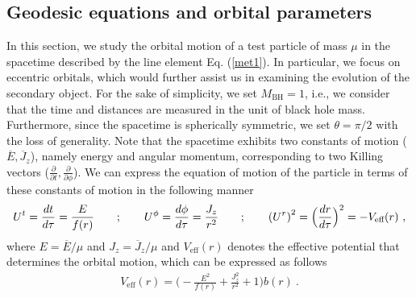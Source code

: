 \documentclass[11pt]{article}
\begin{document}
\subsection{Geodesic equations and orbital parameters}

In this section, we study the orbital motion of a test particle of mass $\mu$ in the spacetime described by the line element Eq. (\ref{met1}). In particular, we focus on eccentric orbitals, which would further assist us in examining the evolution of the secondary object. For the sake of simplicity, we set  $M_{\textrm{BH}}=1$, i.e., we consider that the time and distances are measured in the unit of black hole mass. Furthermore, since the spacetime is spherically symmetric, we set $\theta=\pi/2$ with the loss of generality.  
Note that the spacetime exhibits two constants of motion ($\overline{E}, \overline{J}_{z}$), namely energy and angular momentum, corresponding to two Killing vectors ($\frac{\partial}{\partial t}, \frac{\partial}{\partial\phi}$). We can express the equation of motion of the particle in terms of these constants of motion in the following manner
\begin{align} \label{gd1}
    U^{t}=\frac{dt}{d\tau} = \frac{E}{f(r)} \hspace{7mm} ; \hspace{7mm} U^{\phi}=\frac{d\phi}{d\tau} = \frac{J_{z}}{r^{2}} \hspace{7mm} ; \hspace{7mm}
    \left(U^{r}\right)^2=\Big(\frac{dr}{d\tau}\Big)^{2} =- V_{\textrm{eff}}(r)~,
\end{align}
where $E=\overline{E}/\mu$ and $J_z=\overline{J}_z/\mu$ and $V_{\textrm{eff}}(r)$ denotes the effective potential that determines the orbital motion, which can be expressed as follows
\begin{align}\label{vef}
    V_{\textrm{eff}}(r) = \Big(- \frac{E^{2}}{f(r)} +\frac{J_{z}^{2}}{r^{2}}+1\Big) b(r) ~.
\end{align}
\end{document}
